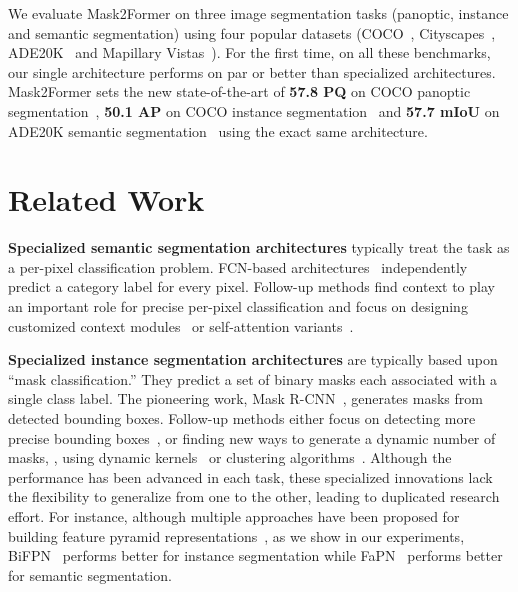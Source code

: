 \documentclass[10pt,twocolumn,letterpaper]{article}
\newcommand{\modelname}{Mask2Former\xspace}
\begin{document}
We evaluate \modelname on three image segmentation tasks (panoptic, instance and semantic segmentation) using four popular datasets (COCO~\cite{lin2014coco}, Cityscapes~\cite{Cordts2016Cityscapes}, ADE20K~\cite{zhou2017ade20k} and Mapillary Vistas~\cite{neuhold2017mapillary}).
For the first time, on all these benchmarks, our single architecture performs on par or better than specialized architectures.
\modelname sets the new state-of-the-art of \textbf{57.8 PQ} on COCO panoptic segmentation~\cite{kirillov2017panoptic}, \textbf{50.1 AP} on COCO instance segmentation~\cite{lin2014coco} and \textbf{57.7 mIoU} on ADE20K semantic segmentation~\cite{zhou2017ade20k} using the exact same architecture.


















 \section{Related Work}

\noindent\textbf{Specialized semantic segmentation architectures} typically treat the task as a per-pixel classification problem. FCN-based architectures~\cite{long2015fully} independently predict a category label for every pixel. Follow-up methods find context to play an important role for  precise per-pixel classification and focus on designing customized context modules~\cite{deeplabV2,deeplabV3,zhao2017pspnet} or self-attention variants~\cite{wang2018non,fu2019dual,yuan2018ocnet,huang2019ccnet,zheng2021rethinking,strudel2021segmenter}.

\noindent\textbf{Specialized instance segmentation architectures} are typically based upon ``mask classification.'' They predict a set of binary masks each associated with a single class label. The pioneering work, Mask R-CNN~\cite{he2017mask}, generates masks from detected bounding boxes. Follow-up methods either focus on detecting more precise bounding boxes~\cite{cai2018cascade,chen2019hybrid}, or finding new ways to generate a dynamic number of masks, \eg, using dynamic kernels~\cite{tian2020conditional,wang2020solov2,yolact-plus-arxiv2019} or clustering algorithms~\cite{kirillov2016instancecut,cheng2020panoptic}. Although the performance has been advanced in each task, these specialized innovations lack the flexibility to generalize from one to the other, leading to duplicated research effort. For instance, although multiple approaches have been proposed for building feature pyramid representations~\cite{lin2016feature}, as we show in our experiments,
BiFPN~\cite{tan2020efficientdet} performs better for instance segmentation while FaPN~\cite{fapn} performs better for semantic segmentation.
\end{document}

